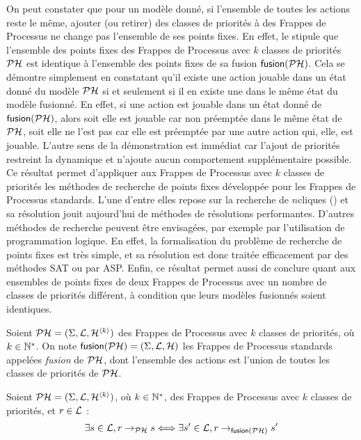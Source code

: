 On peut constater que pour un modèle donné, si l'ensemble de toutes les actions reste le même,
ajouter (ou retirer) des classes de priorités à des Frappes de Processus ne change pas
l'ensemble de ses points fixes.
En effet, le  stipule que
l'ensemble des points fixes des Frappes de Processus avec $k$
classes de priorités $\mathcal{PH}$ est identique à l'ensemble des points fixes de
sa fusion $\mathsf{fusion}(\mathcal{PH})$.
Cela se démontre simplement en constatant qu'il existe une action jouable dans un état donné du
modèle $\mathcal{PH}$ si et seulement si il en existe une dans le même état du modèle fusionné.
En effet, si une action est jouable dans un état donné de $\mathsf{fusion}(\mathcal{PH})$,
alors soit elle est jouable car non préemptée dans le même état de $\mathcal{PH}$,
soit elle ne l'est pas car elle est préemptée par une autre action qui, elle, est jouable.
L'autre sens de la démonstration est immédiat car l'ajout de priorités restreint la dynamique
et n'ajoute aucun comportement supplémentaire possible.
Ce résultat permet d'appliquer aux Frappes de Processus avec $k$ classes de priorités
les méthodes de recherche de points fixes développée pour les Frappes de Processus standards.
L'une d'entre elles repose sur la recherche de $n$\nbd cliques ()
et sa résolution jouit aujourd'hui de méthodes de résolutions performantes.
D'autres méthodes de recherche peuvent être envisagées,
par exemple par l'utilisation de programmation logique.
En effet, la formalisation du problème de recherche de points fixes est très simple,
et sa résolution est donc traitée efficacement par des méthodes SAT ou par ASP.
Enfin, ce résultat permet aussi de conclure quant aux ensembles de points fixes de deux Frappes
de Processus avec un nombre de classes de priorités différent, à condition que
leurs modèles fusionnés soient identiques.

\begin{definition}
  Soient $\mathcal{PH} = (\Sigma, \mathcal{L}, \mathcal{H}^{{\langle k \rangle}})$ des Frappes de Processus avec $k$
  classes de priorités, où $k \in \mathbb{N}^*$.
  On note $\mathsf{fusion}(\mathcal{PH}) = (\Sigma, \mathcal{L}, \mathcal{H})$
  les Frappes de Processus standards appelées \emph{fusion} de $\mathcal{PH}$,
  dont l'ensemble des actions est l'union de toutes les classes de priorités de $\mathcal{PH}$.
\end{definition}

\begin{theorem}
  Soient $\mathcal{PH} = (\Sigma, \mathcal{L}, \mathcal{H}^{{\langle k \rangle}})$, où $k \in \mathbb{N}^*$,
  des Frappes de Processus avec $k$ classes de priorités,
  et $r \in \mathcal{L}$ :
  \[\exists s \in \mathcal{L}, r \rightarrow_{\mathcal{PH}} s \Longleftrightarrow
    \exists s' \in \mathcal{L}, r \rightarrow_{\mathsf{fusion}(\mathcal{PH})} s'\]
\end{theorem}


